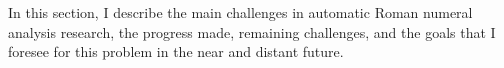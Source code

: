 

In this section, I describe the main challenges in automatic
Roman numeral analysis research, the progress made,
remaining challenges, and the goals that I foresee for this
problem in the near and distant future.
